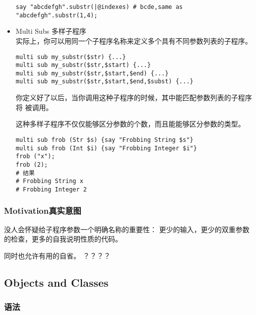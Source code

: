 \documentclass{ctexart}
\begin{document}
\begin{itemize}
\begin{lstlisting}
say "abcdefgh".substr(|@indexes) # bcde,same as "abcdefgh".substr(1,4);
\end{lstlisting}

\item Multi Subs 多样子程序\\
\label{sec-4-5-2-4}%
实际上，你可以用同一个子程序名称来定义多个具有不同参数列表的子程序。

\begin{lstlisting}
multi sub my_substr($str) {...}
multi sub my_substr($str,$start) {...}
multi sub my_substr($str,$start,$end) {...}
multi sub my_substr($str,$start,$end,$subst) {...}
\end{lstlisting}
你定义好了以后，当你调用这种子程序的时候，其中能匹配参数列表的子程序将
被调用。

这种多样子程序不仅仅能够区分参数的个数，而且能能够区分参数的类型。

\begin{lstlisting}
multi sub frob (Str $s) {say "Frobbing String $s"}
multi sub frob (Int $i) {say "Frobbing Integer $i"}
frob ("x");
frob (2);
# 结果
# Frobbing String x
# Frobbing Integer 2
\end{lstlisting}

\end{itemize} %
\subsubsection{Motivation真实意图}
\label{sec-4-5-3}

没人会怀疑给子程序参数一个明确名称的重要性：
更少的输入，更少的双重参数的检查，更多的自我说明性质的代码。

同时也允许有用的自省。
？？？？
\subsection{Objects and Classes}
\label{sec-4-6}
\subsubsection{语法}
\label{sec-4-6-1}
\end{document}
